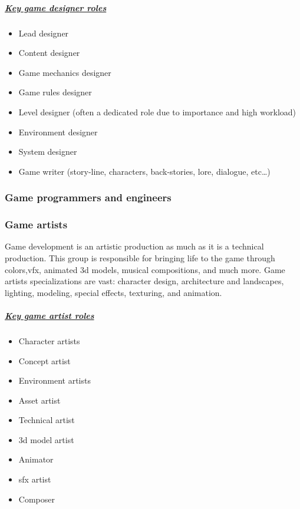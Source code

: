 \documentclass[../main.tex]{subfiles}
\begin{document}
\subparagraph*{\underline{Key game designer roles}}
\begin{itemize}
    \item Lead designer
    \item Content designer
    \item Game mechanics designer
    \item Game rules designer
    \item Level designer (often a dedicated role due to importance and high workload)
    \item Environment designer
    \item System designer
    \item Game writer (story-line, characters, back-stories, lore, dialogue, etc…)

\end{itemize}
\subsubsection{Game programmers and engineers}
\subsubsection{Game artists}
Game development is an artistic production as much as it is a technical production. This group is responsible for bringing life to the game through colors,\acrfull{vfx}, animated \acrshort{3d} models, musical compositions, and much more. Game artists specializations are vast: character design, architecture and landscapes, lighting, modeling, special effects, texturing, and animation.
\subparagraph*{\underline{Key game artist roles}}
\begin{itemize}
    \item Character artists
    \item Concept artist
    \item Environment artists
    \item Asset artist
    \item Technical artist
    \item \acrshort{3d} model artist
    \item Animator
    \item \acrfull{sfx} artist
    \item Composer
\end{itemize}
\end{document}
